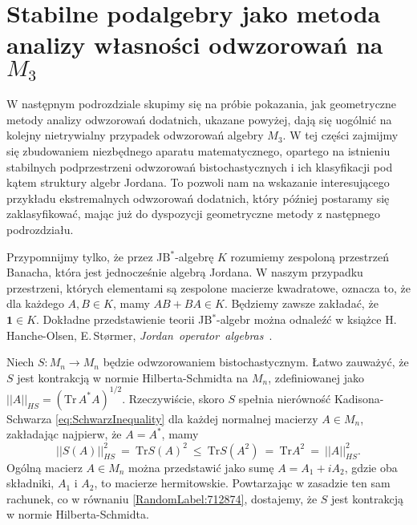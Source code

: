 {\section{Stabilne podalgebry jako metoda analizy własności odwzorowań na $M_{3}$}
\label{sec:M3notes}

W następnym podrozdziale skupimy się na próbie pokazania,
jak geometryczne metody analizy odwzorowań dodatnich,
ukazane powyżej,
dają się uogólnić na kolejny nietrywialny przypadek odwzorowań algebry $M_{3}$.
W tej części zajmijmy się zbudowaniem niezbędnego aparatu matematycznego,
opartego na istnieniu stabilnych podprzestrzeni odwzorowań bistochastycznych
i ich klasyfikacji pod kątem struktury algebr Jordana.
To pozwoli nam na wskazanie interesującego przykładu ekstremalnych odwzorowań
dodatnich, który później postaramy się zaklasyfikować, mając już do dyspozycji
geometryczne metody z następnego podrozdziału.

Przypomnijmy tylko, że przez JB$^{*}$-algebrę $K$ rozumiemy zespoloną
przestrzeń Banacha, która jest jednocześnie algebrą Jordana.
W naszym przypadku przestrzeni, których elementami są zespolone macierze
kwadratowe,
oznacza to, że dla każdego $A, B \in K$, mamy
$AB + BA \in K$.
Będziemy zawsze zakładać, że $\mathbf{1} \in K$.
Dokładne przedstawienie teorii JB$^{*}$-algebr można odnaleźć w książce
H.\,Hanche-Olsen, E.\,St{\o}rmer,
\mbox{\emph{Jordan operator algebras} \cite{Hanche1984}}.

\vspace{0.5cm}
Niech $S\!: M_{n} \rightarrow M_{n}$ będzie odwzorowaniem bistochastycznym.
Łatwo zauważyć, że $S$ jest kontrakcją w normie Hilberta-Schmidta
na $M_{n}$, zdefiniowanej jako
$||A||_{HS} = \left( \text{Tr} \, A^{*} A \right)^{1/2}$.
Rzeczywiście, skoro $S$ spełnia nierówność Kadisona-Schwarza
\eqref{eq:SchwarzInequality}
dla każdej normalnej macierzy $A \in M_{n}$,
zakładając najpierw, że $A = A^{*}$,
mamy
\begin{equation}
\label{RandomLabel:712874}
    || S(A) ||_{HS}^{2} \: = \: \text{Tr} S(A)^{2}
    \: \leq \:  \text{Tr} S(A^{2}) \: = \:
        \text{Tr} A^{2} \: = \: ||A||_{HS}^{2}.
\end{equation}
Ogólną macierz $A \in M_{n}$ można przedstawić jako sumę
$A = A_{1} + i A_{2}$,
gdzie oba składniki, $A_{1}$ i $A_{2}$, to macierze hermitowskie.
Powtarzając w zasadzie ten sam rachunek, co w równaniu
\eqref{RandomLabel:712874},
dostajemy, że $S$ jest kontrakcją w normie Hilberta-Schmidta.

}
